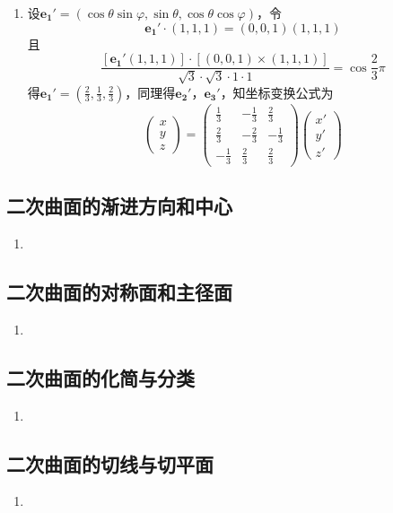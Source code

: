 \documentclass[UTF8]{ctexart}
\begin{document}
\begin{enumerate}
\item 设$\mathbf{e_1}'=\left(\cos\theta\sin\varphi,\sin\theta,\cos\theta\cos\varphi\right)$，令
$$\mathbf{e_1}'\cdot\left(1,1,1\right)=\left(0,0,1\right)\left(1,1,1\right)$$
且
$$\displaystyle\frac{\left[\mathbf{e_1}'\left(1,1,1\right)\right]\cdot\left[\left(0,0,1\right)\times\left(1,1,1\right)\right]}{\sqrt{3}\cdot\sqrt{3}\cdot1\cdot1}=\cos\displaystyle\frac{2}{3}\pi$$
得$\mathbf{e_1}'=\left(\displaystyle\frac{2}{3},\displaystyle\frac{1}{3},\displaystyle\frac{2}{3}\right)$，同理得$\mathbf{e_2}'，\mathbf{e_3}'$，知坐标变换公式为
$$\left(\begin{array}{c}x\\y\\z\end{array}\right)=\left(\begin{array}{ccc}\displaystyle\frac{1}{3}&\displaystyle-\frac{1}{3}&\displaystyle\frac{2}{3}\\\displaystyle\frac{2}{3}&\displaystyle-\frac{2}{3}&-\displaystyle\frac{1}{3}\\\displaystyle-\frac{1}{3}&\displaystyle\frac{2}{3}&\displaystyle\frac{2}{3}\end{array}\right)\left(\begin{array}{c}x'\\y'\\z'\end{array}\right)$$

\end{enumerate}
\subsection{二次曲面的渐进方向和中心}
\begin{enumerate}

\item

\end{enumerate}

\subsection{二次曲面的对称面和主径面}
\begin{enumerate}

\item

\end{enumerate}

\subsection{二次曲面的化简与分类}
\begin{enumerate}

\item

\end{enumerate}

\subsection{二次曲面的切线与切平面}
\begin{enumerate}

\item

\end{enumerate}


\end{document}
